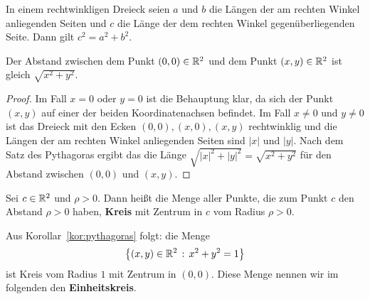 \begin{thm}
	In einem rechtwinkligen Dreieck seien $a$ und $b$ die Längen der am rechten Winkel anliegenden Seiten und $c$ die Länge der dem rechten Winkel gegenüberliegenden Seite. Dann gilt $c^2 = a^2 + b^2$. 
\end{thm} 

\begin{kor} \label{kor:pythagoras}
	Der Abstand zwischen dem Punkt $(0,0) \in \mathbb{R}^2$ und dem Punkt $(x,y) \in \mathbb{R}^2$ ist gleich $\sqrt{x^2 + y^2}$. 
\end{kor} 
\begin{proof} 
 	Im Fall $x =0$ oder $y=0$ ist die Behauptung klar, da sich der Punkt $(x,y)$ auf einer der beiden Koordinatenachsen befindet. Im Fall $x \ne 0$ und $y \ne 0$ ist das Dreieck mit den Ecken $(0,0), (x,0), (x,y)$ rechtwinklig und die Längen der am rechten Winkel anliegenden Seiten sind $|x|$ und $|y|$. Nach dem Satz des Pythagoras ergibt das die Länge $\sqrt{|x|^2 + |y|^2} = \sqrt{x^2 + y^2}$ für den Abstand zwischen $(0,0)$ und $(x,y)$. 
\end{proof} 

\begin{defn}
	Sei $c \in \mathbb{R}^2$ und $\rho>0$. Dann heißt die Menge aller Punkte, die zum Punkt $c$ den Abstand $\rho>0$ haben, \textbf{Kreis} mit Zentrum in $c$ vom Radius $\rho>0$. 
\end{defn} 

\begin{bem}
	Aus Korollar~\ref{kor:pythagoras} folgt: die Menge 
	\[
		\left\{ (x,y) \in \mathbb{R}^2 \,:\, x^2 + y^2 = 1 \right\}
	\] ist Kreis vom Radius $1$ mit Zentrum in $(0,0)$. Diese Menge nennen wir im folgenden den \textbf{Einheitskreis}. 
\end{bem} 

